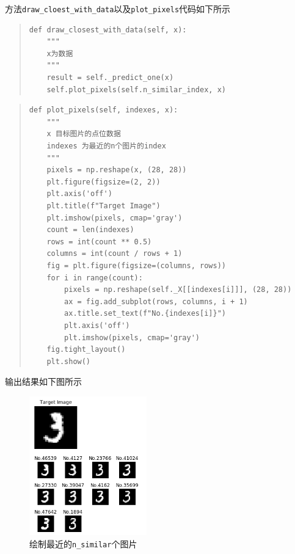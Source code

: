 \documentclass[UTF8]{ctexart}
\begin{document}
方法\lstinline{draw_cloest_with_data}以及\lstinline{plot_pixels}代码如下所示

\begin{quote}
    \begin{lstlisting}[breaklines, title=\lstinline{draw_closest_with_data}方法]
def draw_closest_with_data(self, x):
    """
    x为数据
    """
    result = self._predict_one(x)
    self.plot_pixels(self.n_similar_index, x)
    \end{lstlisting}
\end{quote}


\begin{quote}
    \begin{lstlisting}[breaklines, title=\lstinline{plot_pixels}方法]
def plot_pixels(self, indexes, x):
    """
    x 目标图片的点位数据
    indexes 为最近的n个图片的index
    """
    pixels = np.reshape(x, (28, 28))
    plt.figure(figsize=(2, 2))
    plt.axis('off')
    plt.title(f"Target Image")
    plt.imshow(pixels, cmap='gray')
    count = len(indexes)
    rows = int(count ** 0.5)
    columns = int(count / rows + 1)
    fig = plt.figure(figsize=(columns, rows))
    for i in range(count):
        pixels = np.reshape(self._X[[indexes[i]]], (28, 28))
        ax = fig.add_subplot(rows, columns, i + 1)
        ax.title.set_text(f"No.{indexes[i]}")
        plt.axis('off')
        plt.imshow(pixels, cmap='gray')
    fig.tight_layout()
    plt.show()
    \end{lstlisting}
\end{quote}

输出结果如下图所示
\begin{figure}[h]
    \centering
    \includegraphics[width=2in]{asset/closest.png}
    \caption{绘制最近的\lstinline{n_similar}个图片} %
\end{figure}

\newpage
\end{document}
